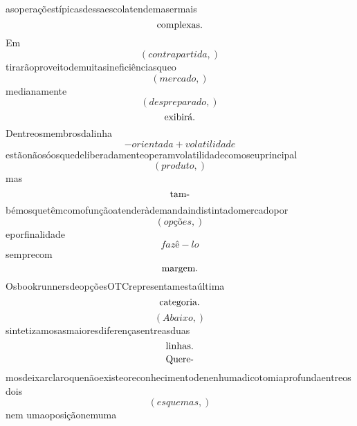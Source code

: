 \documentclass{article}
\begin{document}
\begin{equation}
\end{equation}asoperaçõestípicasdessaescolatendemasermais\begin{equation}
$complexas.$
\end{equation}Em\begin{equation}
\left( contrapartida,\right)
\end{equation}tirarãoproveitodemuitasineficiênciasqueo\begin{equation}
\left( mercado,\right)
\end{equation}medianamente\begin{equation}
\left( despreparado,\right)
\end{equation}\begin{equation}
$exibirá.$
\end{equation}Dentreosmembrosdalinha\begin{equation}
- orientada + volatilidade
\end{equation}estãonãosóosquedeliberadamenteoperamvolatilidadecomoseuprincipal\begin{equation}
\left( produto,\right)
\end{equation}mas\begin{equation}
$tam-$
\end{equation}bémosquetêmcomofunçãoatenderàdemandaindistintadomercadopor\begin{equation}
\left( opções,\right)
\end{equation}eporfinalidade\begin{equation}
fazê - lo
\end{equation}semprecom\begin{equation}
$margem.$
\end{equation}OsbookrunnersdeopçõesOTCrepresentamestaúltima\begin{equation}
$categoria.$
\end{equation}\begin{equation}
\left( Abaixo,\right)
\end{equation}sintetizamosasmaioresdiferençasentreasduas\begin{equation}
$linhas.$
\end{equation}\begin{equation}
$Quere-$
\end{equation}mosdeixarclaroquenãoexisteoreconhecimentodenenhumadicotomiaprofundaentreosdois\begin{equation}
\left( esquemas,\right)
\end{equation}nem umaoposiçãonemuma\begin{equation}

\end{equation}
\end{document}

